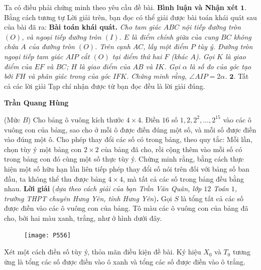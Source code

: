 \begin{multicols}{2}
	\vskip 0.05cm
	Ta có điều phải chứng minh theo yêu cầu đề bài.
	\vskip 0.05cm
	\textbf{\color{thachthuctoanhoc}Bình luận và Nhận xét}
	\vskip 0.05cm
	$\pmb{1.}$ Bằng cách tương tự Lời giải trên, bạn đọc có thể giải được bài toán khái quát sau của bài đã ra:
	\vskip 0.05cm
	\textbf{\color{thachthuctoanhoc}Bài toán khái quát.} \textit{Cho tam giác $ABC$ nội tiếp đường tròn $(O)$, và ngoại tiếp đường tròn $(I)$. $E$ là điểm chính giữa của cung $BC$ không chứa $A$ của đường tròn $(O)$. Trên cạnh $AC$, lấy một điểm $P$ tùy ý. Đường tròn ngoại tiếp tam giác $AIP$ cắt $(O)$ tại điểm thứ hai $F$ (khác $A$). Gọi $K$ là giao điểm của $EF$ và $BC$; $H$ là giao điểm của $AB$ và $IK$. Gọi $\alpha$ là số đo của góc tạo bởi $FH$ và phân giác trong của góc $IFK$. Chứng minh rằng, $\angle AIP = 2\alpha$.}
	\vskip 0.05cm
	$\pmb{2.}$ Tất cả các lời giải Tạp chí nhận được từ bạn đọc đều là lời giải đúng.
	\begin{flushright}
		\textbf{\color{thachthuctoanhoc}Trần Quang Hùng}
	\end{flushright}
	{}
	(Mức $B$) Cho bảng ô vuông kích thước $4 \times 4$. Điền $16$ số $1, 2, 2^2, \ldots,2^{15}$ vào các ô vuông con của bảng, sao cho ở mỗi ô được điền đúng một số, và mỗi số được điền vào đúng một ô. Cho phép thay đổi các số có trong bảng, theo quy tắc: Mỗi lần, chọn tùy ý một bảng con $2 \times 2$ của bảng đã cho, rồi cộng thêm vào mỗi số có trong bảng con đó cùng một số thực tùy ý.
	\vskip 0.05cm
	Chứng minh rằng, bằng cách thực hiện một số hữu hạn lần liên tiếp phép thay đổi số nói trên đối với bảng số ban đầu, ta không thể thu được bảng $4 \times 4$, mà tất cả các số trong bảng đều bằng nhau.
	\vskip 0.05cm
	\textbf{\color{thachthuctoanhoc}Lời giải} (\textit{dựa theo cách giải của bạn Trần Văn Quân, lớp $12$ Toán $1$, trường THPT chuyên Hưng Yên, tỉnh Hưng Yên})\textbf{\color{thachthuctoanhoc}.}
	\vskip 0.05cm
	Gọi $S$ là tổng tất cả các số được điền vào các ô vuông con của bảng.
	\vskip 0.05cm
	Tô màu các ô vuông con của bảng đã cho, bởi hai màu xanh, trắng, như ở hình dưới đây.
			\begin{figure}[H]
		\vspace*{-5pt}
		\centering
		\captionsetup{labelformat= empty, justification=centering}
		\texttt{[image: P556]}
		\vspace*{-10pt}
	\end{figure}
	Xét một cách điền số tùy ý, thỏa mãn điều kiện đề bài.
	\vskip 0.05cm
	Ký hiệu $X_0$  và $T_0$  tương ứng là tổng các số được điền vào ô xanh và tổng các số được điền vào ô trắng.

\end{multicols}
